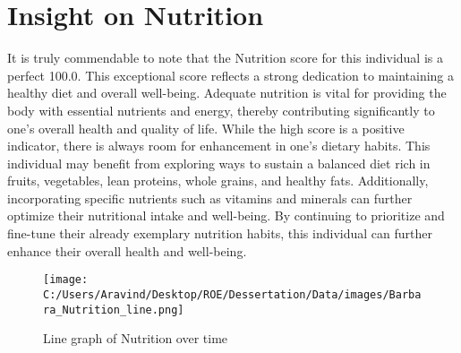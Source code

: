 \documentclass[10pt, a4paper]{article}%
\begin{document}
\section{Insight on Nutrition}%
\label{sec:InsightonNutrition}%
It is truly commendable to note that the Nutrition score for this individual is a perfect 100.0. This exceptional score reflects a strong dedication to maintaining a healthy diet and overall well{-}being. Adequate nutrition is vital for providing the body with essential nutrients and energy, thereby contributing significantly to one's overall health and quality of life.\newline%
\newline%
While the high score is a positive indicator, there is always room for enhancement in one's dietary habits. This individual may benefit from exploring ways to sustain a balanced diet rich in fruits, vegetables, lean proteins, whole grains, and healthy fats. Additionally, incorporating specific nutrients such as vitamins and minerals can further optimize their nutritional intake and well{-}being. \newline%
\newline%
By continuing to prioritize and fine{-}tune their already exemplary nutrition habits, this individual can further enhance their overall health and well{-}being.%


\begin{figure}[H]%
\centering%
\texttt{[image: C:/Users/Aravind/Desktop/ROE/Dessertation/Data/images/Barbara\_Nutrition\_line.png]}%
\caption{Line graph of Nutrition over time}%
\end{figure}

%
\end{document}

